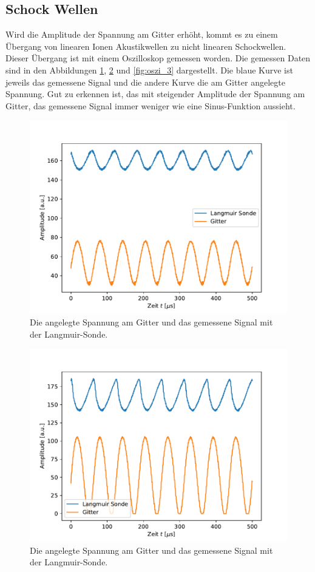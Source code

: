 \subsection{Schock Wellen}
Wird die Amplitude der Spannung am Gitter erhöht, kommt es zu einem Übergang von linearen Ionen Akustikwellen zu nicht linearen Schockwellen.  Dieser Übergang ist mit einem Oszilloskop gemessen worden. Die gemessen Daten sind in den Abbildungen \ref{fig:oszi_2}, \ref{fig:oszi_1} und \ref{fig:oszi_3} dargestellt. Die blaue Kurve ist jeweils das gemessene Signal und die andere Kurve die am Gitter angelegte Spannung. Gut zu erkennen ist, das mit steigender Amplitude der Spannung am Gitter, das gemessene Signal immer weniger wie eine Sinus-Funktion aussieht. 
\begin{figure}[H]
\centering
\includegraphics[scale=0.6]{oszi_2.pdf}
\caption{Die angelegte Spannung am Gitter und das gemessene Signal mit der Langmuir-Sonde.}
\label{fig:oszi_2}
\end{figure}

\begin{figure}[H]
\centering
\includegraphics[scale=0.6]{oszi_1.pdf}
\caption{Die angelegte Spannung am Gitter und das gemessene Signal mit der Langmuir-Sonde.}
\label{fig:oszi_1}
\end{figure}




